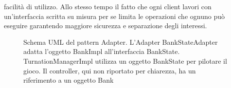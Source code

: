 facilità di utilizzo. 
Allo stesso tempo il fatto che ogni client lavori con un'interfaccia scritta su misura per se limita le operazioni che ognuno può eseguire garantendo maggiore sicurezza e separazione degli interessi.\newline
\begin{figure}[H]
    \centering
    \caption{Schema UML del pattern Adapter. L'Adapter BankStateAdapter adatta l'oggetto BankImpl all'interfaccia BankState. TurnationManagerImpl utilizza
    un oggetto BankState per pilotare il gioco. Il controller, qui non riportato per chiarezza, ha un riferimento a un oggetto Bank}
	\label{img:bankstate}
\end{figure}
